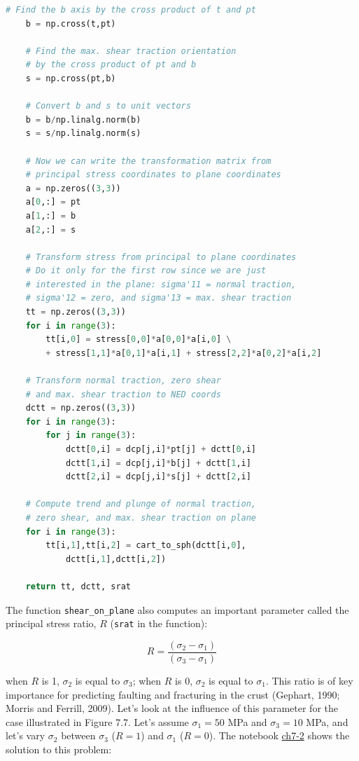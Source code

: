 \documentclass[a4paper , 12pt]{book}
\newcommand{\code}[1]{\colorbox{light-gray}{\texttt{#1}}}
\begin{document}
\begin{center}
\begin{lstlisting}[language=Python, frame=single]
	# Find the b axis by the cross product of t and pt
	b = np.cross(t,pt)
	
	# Find the max. shear traction orientation
	# by the cross product of pt and b
	s = np.cross(pt,b)
	
	# Convert b and s to unit vectors
	b = b/np.linalg.norm(b)
	s = s/np.linalg.norm(s)
	
	# Now we can write the transformation matrix from
	# principal stress coordinates to plane coordinates
	a = np.zeros((3,3))
	a[0,:] = pt
	a[1,:] = b
	a[2,:] = s
	
	# Transform stress from principal to plane coordinates
	# Do it only for the first row since we are just
	# interested in the plane: sigma'11 = normal traction,
	# sigma'12 = zero, and sigma'13 = max. shear traction
	tt = np.zeros((3,3))
	for i in range(3):
		tt[i,0] = stress[0,0]*a[0,0]*a[i,0] \
		+ stress[1,1]*a[0,1]*a[i,1] + stress[2,2]*a[0,2]*a[i,2]
	
	# Transform normal traction, zero shear
	# and max. shear traction to NED coords
	dctt = np.zeros((3,3))
	for i in range(3):
		for j in range(3):
			dctt[0,i] = dcp[j,i]*pt[j] + dctt[0,i]
			dctt[1,i] = dcp[j,i]*b[j] + dctt[1,i]
			dctt[2,i] = dcp[j,i]*s[j] + dctt[2,i]
	
	# Compute trend and plunge of normal traction,
	# zero shear, and max. shear traction on plane
	for i in range(3):
		tt[i,1],tt[i,2] = cart_to_sph(dctt[i,0],
			dctt[i,1],dctt[i,2])
	
	return tt, dctt, srat
\end{lstlisting}
\end{center}

The function \code{shear\_on\_plane} also computes an important parameter called the principal stress ratio, $R$ (\code{srat} in the function):

\begin{equation}
    R=\frac{(\sigma_2-\sigma_1)}{(\sigma_3-\sigma_1)}
\end{equation}

when $R$ is 1, $\sigma_2$ is equal to $\sigma_3$; when $R$ is 0, $\sigma_2$ is equal to $\sigma_1$. This ratio is of key importance for predicting faulting and fracturing in the crust (Gephart, 1990; Morris and Ferrill, 2009). Let's look at the influence of this parameter for the case illustrated in Figure 7.7. Let's assume $\sigma_1 = 50$ MPa and $\sigma_3 = 10$ MPa, and let's vary $\sigma_2$ between $\sigma_3$ ($R=1$) and $\sigma_1$ ($R=0$). The notebook \href{https://github.com/nfcd/compGeo/blob/master/source/notebooks/ch7-2.ipynb}{ch7-2} shows the solution to this problem:
\end{document}
